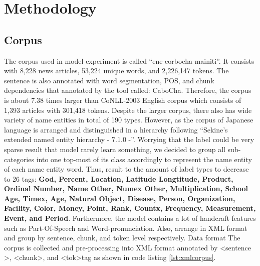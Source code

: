 \section{Methodology}

\begin{CJK*}{UTF8}{min}
\subsection{Corpus}
The corpus used in model experiment is called ``ene-corbocha-mainiti''.
It consists with 8,228 news articles, 53,224 unique words, and 2,226,147 tokens.
The sentence is also annotated with word segmentation, POS, and chunk dependencies that annotated by the tool called: CaboCha.
Therefore, the corpus is about 7.38 times larger than CoNLL-2003 English corpus which consists of 1,393 articles with 301,418 tokens.
Despite the larger corpus, there also has wide variety of name entities in total of 190 types.
However, as the corpus of Japanese language is arranged and distinguished in a hierarchy following ``Sekine's extended named entity hierarchy - 7.1.0 -''.
Worrying that the label could be very sparse result that model rarely learn something, we decided to group all sub-categories into one top-most of its class accordingly to represent the name entity of each name entity word.
Thus, result to the amount of label types to decrease to 26 tags: \textbf{God, Percent, Location, Latitude Longtitude, Product, Ordinal Number, Name Other, Numex Other, Multiplication, School Age, Timex, Age, Natural Object, Disease, Person, Organization, Facility, Color, Money, Point, Rank, Countx, Frequency, Measurement, Event, and Period}.
Furthermore, the model contains a lot of handcraft features such as Part-Of-Speech and Word-pronunciation.
Also, arrange in XML format and group by sentence, chunk, and token level respectively. Data format The corpus is collected and pre-processing into XML format annotated by \textless sentence \textgreater, \textless chunk\textgreater, and \textless tok\textgreater tag as shown in code listing \ref{lst:xmlcorpus}.


\end{CJK*}
